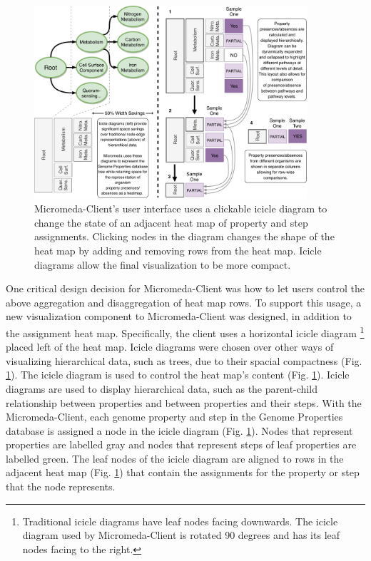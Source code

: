 \begin{figure}[!ht]
  \centering
	\includegraphics[width=0.9\textwidth]{media/visualization_design_philosphy.pdf}
	 \caption{Micromeda-Client's user interface uses a clickable icicle diagram to change the state of an adjacent heat map of property and step assignments. Clicking nodes in the diagram changes the shape of the heat map by adding and removing rows from the heat map. Icicle diagrams allow the final visualization to be more compact.}
	 \label{fig:visualization-philosophy}
\end{figure}

One critical design decision for Micromeda-Client was how to let users control the above aggregation and disaggregation of heat map rows. To support this usage, a new visualization component to Micromeda-Client was designed, in addition to the assignment heat map. Specifically, the client uses a horizontal icicle diagram \footnote{Traditional icicle diagrams have leaf nodes facing downwards. The icicle diagram used by Micromeda-Client is rotated 90 degrees and has its leaf nodes facing to the right.} placed left of the heat map. Icicle diagrams were chosen over other ways of visualizing hierarchical data, such as trees, due to their spacial compactness (Fig. \ref{fig:visualization-philosophy}). The icicle diagram is used to control the heat map's content (Fig. \ref{fig:visualization-philosophy}). Icicle diagrams are used to display hierarchical data, such as the parent-child relationship between properties and between properties and their steps. With the Micromeda-Client, each genome property and step in the Genome Properties database is assigned a node in the icicle diagram (Fig. \ref{fig:visualization-philosophy}). Nodes that represent properties are labelled gray and nodes that represent steps of leaf properties are labelled green. The leaf nodes of the icicle diagram are aligned to rows in the adjacent heat map (Fig. \ref{fig:visualization-philosophy}) that contain the assignments for the property or step that the node represents.

